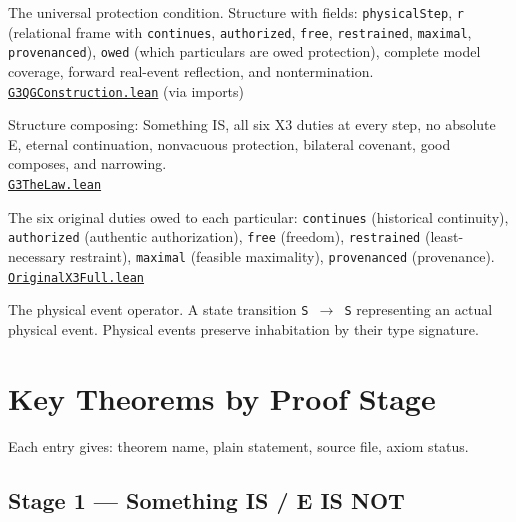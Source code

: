 \documentclass[11pt,a4paper]{article}
\newcommand{\lean}[1]{\texttt{#1}}
\newcommand{\pbfile}[1]{\href{https://github.com/Tobillicious/universal-protection-theory/blob/main/evidence/physical-bridges/PhysicalBridges/#1}{\texttt{\small #1}}}
\begin{document}
\begin{description}[leftmargin=3cm,style=nextline]

\item[\lean{BCRDIsQG (S P : Type)}]
The universal protection condition. Structure with fields: \lean{physicalStep}, \lean{r} (relational frame with \lean{continues}, \lean{authorized}, \lean{free}, \lean{restrained}, \lean{maximal}, \lean{provenanced}), \lean{owed} (which particulars are owed protection), complete model coverage, forward real-event reflection, and nontermination.\\
\pbfile{G3QGConstruction.lean} (via imports)

\item[\lean{TheLaw (S P : Type)}]
Structure composing: Something IS, all six X3 duties at every step, no absolute E, eternal continuation, nonvacuous protection, bilateral covenant, good composes, and narrowing.\\
\pbfile{G3TheLaw.lean}

\item[\lean{OriginalX3}]
The six original duties owed to each particular: \lean{continues} (historical continuity), \lean{authorized} (authentic authorization), \lean{free} (freedom), \lean{restrained} (least-necessary restraint), \lean{maximal} (feasible maximality), \lean{provenanced} (provenance).\\
\pbfile{OriginalX3Full.lean}

\item[\lean{W}]
The physical event operator. A state transition \lean{S $\to$ S} representing an actual physical event. Physical events preserve inhabitation by their type signature.

\end{description}


\section{Key Theorems by Proof Stage}

Each entry gives: theorem name, plain statement, source file, axiom status.

\subsection{Stage 1 --- Something IS / E IS NOT}
\end{document}
